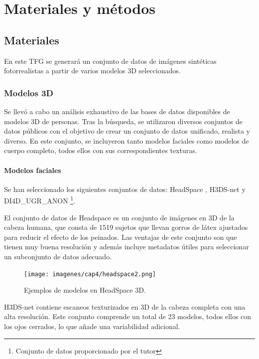 \chapter{Materiales y métodos}
\thispagestyle{empty}

\section{Materiales}

En este TFG se generará un conjunto de datos de imágenes sintéticas fotorrealistas a partir de varios modelos 3D seleccionados.

\subsection{Modelos 3D}

Se llevó a cabo un análisis exhaustivo de las bases de datos disponibles de modelos 3D de personas. Tras la búsqueda, se utilizaron diversos conjuntos de datos públicos con el objetivo de crear un conjunto de datos unificado, realista y diverso. En este conjunto, se incluyeron tanto modelos faciales como modelos de cuerpo completo, todos ellos con sus correspondientes texturas.

\subsubsection{Modelos faciales}
Se han seleccionado los siguientes conjuntos de datos: HeadSpace \cite{60}, H3DS-net \cite{61} y DI4D\_UGR\_ANON \footnote{Conjunto de datos proporcionado por el tutor}.

El conjunto de datos de Headspace \cite{60} es un conjunto de imágenes en 3D de la cabeza humana, que consta de 1519 sujetos que llevan gorros de látex ajustados para reducir el efecto de los peinados. Las ventajas de este conjunto son que tienen muy buena resolución y además incluye metadatos útiles para seleccionar un subconjunto de datos adecuado.

\begin{figure}[h]
	\centering
	\texttt{[image: imagenes/cap4/headspace2.png]}
	\caption[Ejemplos HeadSpace 3D.]{Ejemplos de modelos en HeadSpace 3D.}
	\label{fig17}
\end{figure}

H3DS-net \cite{61} contiene escaneos texturizados en 3D de la cabeza completa con una alta resolución. Este conjunto comprende un total de 23 modelos, todos ellos con los ojos cerrados, lo que añade una variabilidad adicional.

